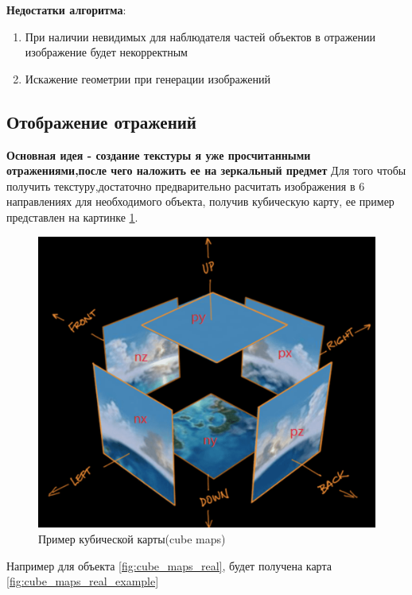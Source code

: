 \documentclass[a4paper,14pt, unknownkeysallowed]{extreport}
\begin{document}
\textbf{Недостатки алгоритма}:
\begin{enumerate}
	\item При наличии невидимых для наблюдателя частей объектов в отражении изображение будет некорректным
	\item Искажение геометрии при генерации изображений
\end{enumerate}

\subsection{Отображение отражений}
\textbf{Основная идея - создание текстуры я уже просчитанными отражениями,после чего наложить ее на зеркальный предмет} \newline
Для того чтобы получить текстуру,достаточно предварительно расчитать изображения в 6 направлениях для необходимого объекта, получив кубическую карту, ее пример представлен на картинке \ref{fig:cube_maps}.\cite{reflexion_types}
\begin{figure}[h]
	\centering
	\includegraphics[scale=0.4]{cube_maps}
	\caption{Пример кубической карты(cube maps)}
	\label{fig:cube_maps}
\end{figure}

Например для объекта \ref{fig:cube_maps_real}, будет получена карта \ref{fig:cube_maps_real_example}
\end{document}
